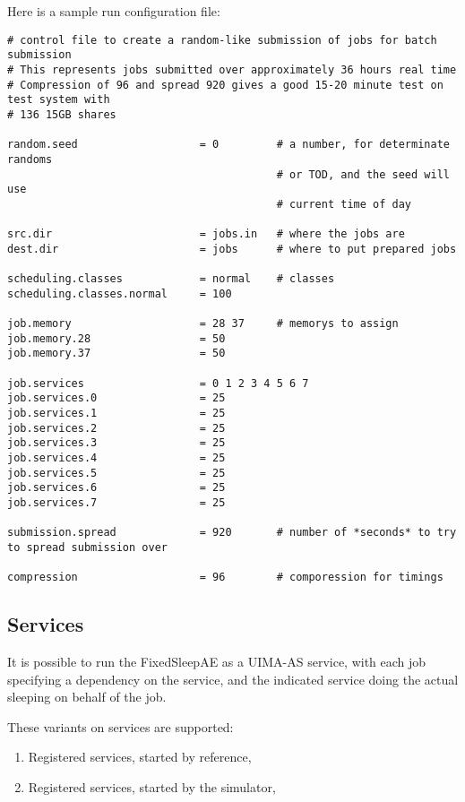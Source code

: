      Here is a sample run configuration file:
\begin{verbatim}
# control file to create a random-like submission of jobs for batch submission
# This represents jobs submitted over approximately 36 hours real time
# Compression of 96 and spread 920 gives a good 15-20 minute test on test system with
# 136 15GB shares

random.seed                   = 0         # a number, for determinate randoms
                                          # or TOD, and the seed will use
                                          # current time of day

src.dir                       = jobs.in   # where the jobs are
dest.dir                      = jobs      # where to put prepared jobs

scheduling.classes            = normal    # classes
scheduling.classes.normal     = 100

job.memory                    = 28 37     # memorys to assign
job.memory.28                 = 50
job.memory.37                 = 50

job.services                  = 0 1 2 3 4 5 6 7
job.services.0                = 25
job.services.1                = 25
job.services.2                = 25
job.services.3                = 25
job.services.4                = 25
job.services.5                = 25
job.services.6                = 25
job.services.7                = 25

submission.spread             = 920       # number of *seconds* to try to spread submission over 

compression                   = 96        # comporession for timings
\end{verbatim}
     
     \subsection{Services}
     \label{subsec:simulation.services}
     It is possible to run the FixedSleepAE as a UIMA-AS service, with each job
     specifying a dependency on the service, and the indicated service doing the
     actual sleeping on behalf of the job.

     These variants on services are supported:
     \begin{enumerate}
       \item Registered services, started by reference,
       \item Registered services, started by the simulator,
     \end{enumerate}

